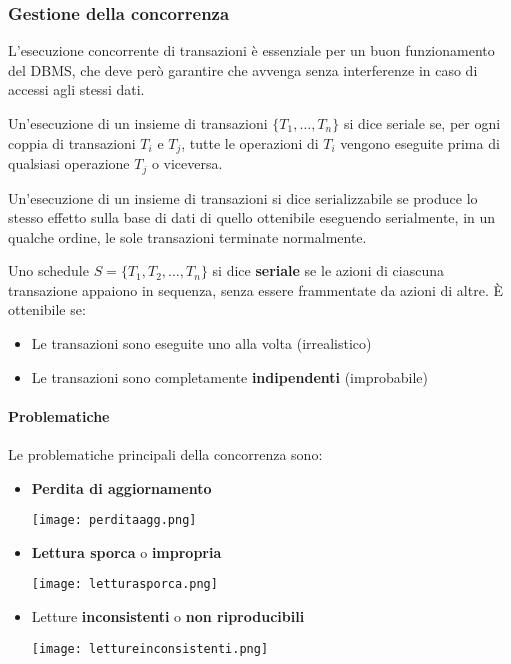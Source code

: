 \subsubsection{Gestione della concorrenza}
L’esecuzione concorrente di transazioni è essenziale per un buon funzionamento del DBMS, che deve però garantire che
avvenga senza interferenze in caso di accessi agli stessi dati.

\begin{definition}[Serialità]
	Un’esecuzione di un insieme di transazioni $\{T_1, \ldots, T_n\}$ si dice seriale se, per ogni coppia di transazioni $T_i$ e $T_j$, tutte le operazioni di $T_i$ vengono eseguite prima di qualsiasi operazione $T_j$ o viceversa.
\end{definition}

\begin{definition}[Serializzabilità]
	Un’esecuzione di un insieme di transazioni si dice serializzabile se produce lo stesso effetto sulla base di dati di quello
	ottenibile eseguendo serialmente, in un qualche ordine, le sole transazioni terminate normalmente.
\end{definition}

Uno schedule $S=\{T_1, T_2, \ldots, T_n\}$ si dice \textbf{seriale} se le azioni di ciascuna transazione appaiono in sequenza, senza essere frammentate da azioni di altre. È ottenibile se:
\begin{itemize}
	\item Le transazioni sono eseguite uno alla volta (irrealistico)
	\item Le transazioni sono completamente \textbf{indipendenti} (improbabile)
\end{itemize}
\paragraph{Problematiche} Le problematiche principali della concorrenza sono:
\begin{itemize}
	\item \textbf{Perdita di aggiornamento}
	\begin{center}
		\texttt{[image: perditaagg.png]}
	\end{center}
	\item \textbf{Lettura sporca} o \textbf{impropria}
	\begin{center}
		\texttt{[image: letturasporca.png]}
	\end{center}
	\item Letture \textbf{inconsistenti} o \textbf{non riproducibili}
	\begin{center}
		\texttt{[image: lettureinconsistenti.png]}
	\end{center}
\end{itemize}

